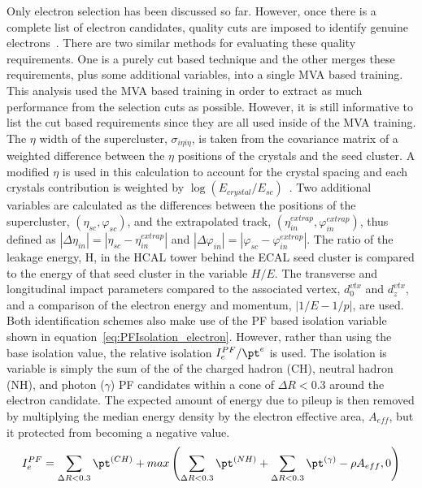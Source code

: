 Only electron selection has been discussed so far.
However, once there is a complete list of electron candidates, quality cuts are imposed to identify genuine electrons~\cite{ElectronCutBased,ElectronMVABased,ElectronConversionVeto}.
There are two similar methods for evaluating these quality requirements.
One is a purely cut based technique and the other merges these requirements, plus some additional variables, into a single MVA based training.
This analysis used the MVA based training in order to extract as much performance from the selection cuts as possible.
However, it is still informative to list the cut based requirements since they are all used inside of the MVA training.
The $\eta$ width of the supercluster, $\sigma_{i{\eta}i{\eta}}$, is taken from the covariance matrix of a weighted difference between the $\eta$ positions of the crystals and the seed cluster.
A modified $\eta$ is used in this calculation to account for the crystal spacing and each crystals contribution is weighted by $\log\left(E_{crystal}/E_{sc}\right)$~\cite{EgammaShowerShape}.
Two additional variables are calculated as the differences between the positions of the supercluster, $\left(\eta_{sc},\varphi_{sc}\right)$, and the extrapolated track, $\left(\eta_{in}^{extrap},\varphi_{in}^{extrap}\right)$, thus defined as $|\Delta\eta_{in}|=|\eta_{sc}-\eta_{in}^{extrap}|$ and $|\Delta\varphi_{in}|=|\varphi_{sc}-\varphi_{in}^{extrap}|$.
The ratio of the leakage energy, H, in the HCAL tower behind the ECAL seed cluster is compared to the energy of that seed cluster in the variable $H/E$.
The transverse and longitudinal impact parameters compared to the associated vertex, $d_{0}^{vtx}$ and $d_{z}^{vtx}$, and a comparison of the electron energy and momentum, $|1/E-1/p|$, are used.
Both identification schemes also make use of the PF based isolation variable shown in equation~\ref{eq:PFIsolation_electron}. However, rather than using the base isolation value, the relative isolation $I_{e}^{PF}/\pt^{e}$ is used.
The isolation is variable is simply the sum of the \pt of the charged hadron (CH), neutral hadron (NH), and photon ($\gamma$) PF candidates within a cone of $\Delta{R}<0.3$ around the electron candidate.
The expected amount of energy due to pileup is then removed by multiplying the median energy density by the electron effective area, $A_{eff}$, but it protected from becoming a negative value.
\begin{equation}
\label{eq:PFIsolation_electron}
I_{e}^{PF}=\sum_{\Delta{R}<0.3}\pt^{\left(CH\right)}+max\left(\sum_{\Delta{R}<0.3}\pt^{\left(NH\right)}+\sum_{\Delta{R}<0.3}\pt^{\left(\gamma\right)}-{\rho}A_{eff},0\right)
\end{equation}


